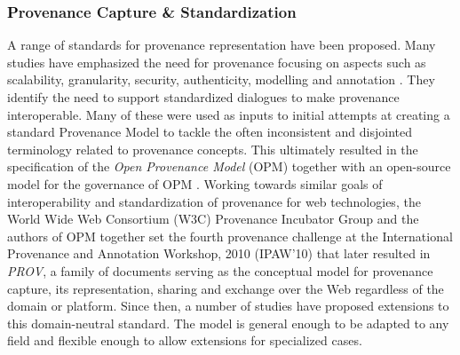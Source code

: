 \documentclass[a4paper,num-refs]{oup-contemporary}
\begin{document}
\subsubsection{\textcolor{black} Provenance Capture \& Standardization}
A range of standards for provenance representation have been proposed. Many studies have emphasized the need for provenance focusing on aspects such as scalability, granularity, security, authenticity, modelling and annotation \citep{herschel_2017}. They identify the need to support standardized dialogues to make provenance interoperable. Many of these were used as inputs to initial attempts at creating a standard Provenance Model to tackle the often inconsistent and disjointed terminology related to provenance concepts. This ultimately resulted in the specification of the \textit{Open Provenance Model} (OPM)\citep{Moreau2008} together with an open-source model for the governance of OPM \citep{moreau2009governance}. Working towards similar goals of interoperability and standardization of provenance for web technologies, the World Wide Web Consortium (W3C) Provenance Incubator Group \citep{W3CProvWorkingGroup} and the authors of OPM together set the fourth provenance challenge at the International Provenance and Annotation Workshop, 2010 (IPAW'10) that later resulted in \textit{PROV}, a family of documents serving as the conceptual model for provenance capture, its representation, sharing and exchange over the Web \citep{Moreau2015} regardless of the domain or platform. Since then, a number of studies have proposed extensions to this domain-neutral standard. The model is general enough to be adapted to any field and flexible enough to allow extensions for specialized cases. 
\end{document}
